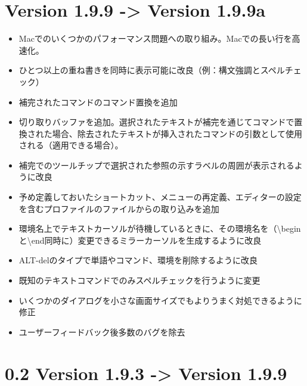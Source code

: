 \documentclass[]{book}
\begin{document}
\section{Version 1.9.9 -\textgreater{} Version 1.9.9a}

\begin{itemize}
\item
  Macでのいくつかのパフォーマンス問題への取り組み。Macでの長い行を高速化。
\item
  ひとつ以上の重ね書きを同時に表示可能に改良（例：構文強調とスペルチェック）
\item
  補完されたコマンドのコマンド置換を追加
\item
  切り取りバッファを追加。選択されたテキストが補完を通じてコマンドで置換された場合、除去されたテキストが挿入されたコマンドの引数として使用される（適用できる場合）。
\item
  補完でのツールチップで選択された参照の示すラベルの周囲が表示されるように改良
\item
  予め定義しておいたショートカット、メニューの再定義、エディターの設定を含むプロファイルのファイルからの取り込みを追加
\item
  環境名上でテキストカーソルが待機しているときに、その環境名を（\textbackslash{}beginと\textbackslash{}end同時に）変更できるミラーカーソルを生成するように改良
\item
  ALT-delのタイプで単語やコマンド、環境を削除するように改良
\item
  既知のテキストコマンドでのみスペルチェックを行うように変更
\item
  いくつかのダイアログを小さな画面サイズでもよりうまく対処できるように修正
\item
  ユーザーフィードバック後多数のバグを除去
\end{itemize}

\section{0.2 Version 1.9.3 -\textgreater{} Version 1.9.9}
\end{document}

